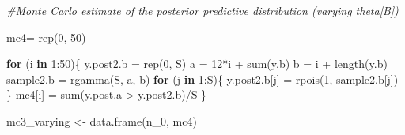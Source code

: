\documentclass[
  11pt,
]{article}
\newenvironment{Shaded}{\begin{snugshade}}{\end{snugshade}}
\newcommand{\CommentTok}[1]{\textcolor[rgb]{0.56,0.35,0.01}{\textit{#1}}}
\newcommand{\ControlFlowTok}[1]{\textcolor[rgb]{0.13,0.29,0.53}{\textbf{#1}}}
\newcommand{\DecValTok}[1]{\textcolor[rgb]{0.00,0.00,0.81}{#1}}
\newcommand{\FunctionTok}[1]{\textcolor[rgb]{0.00,0.00,0.00}{#1}}
\newcommand{\NormalTok}[1]{#1}
\newcommand{\OtherTok}[1]{\textcolor[rgb]{0.56,0.35,0.01}{#1}}
\newcommand{\SpecialCharTok}[1]{\textcolor[rgb]{0.00,0.00,0.00}{#1}}
\begin{document}
\begin{Shaded}
\begin{Highlighting}[]
\CommentTok{\#Monte Carlo estimate of the posterior predictive distribution (varying theta[B])}

\NormalTok{mc4}\OtherTok{=} \FunctionTok{rep}\NormalTok{(}\DecValTok{0}\NormalTok{, }\DecValTok{50}\NormalTok{)}

\ControlFlowTok{for}\NormalTok{ (i }\ControlFlowTok{in} \DecValTok{1}\SpecialCharTok{:}\DecValTok{50}\NormalTok{)\{}
\NormalTok{  y.post2.b }\OtherTok{=} \FunctionTok{rep}\NormalTok{(}\DecValTok{0}\NormalTok{, S)}
\NormalTok{  a }\OtherTok{=} \DecValTok{12}\SpecialCharTok{*}\NormalTok{i }\SpecialCharTok{+} \FunctionTok{sum}\NormalTok{(y.b)}
\NormalTok{  b }\OtherTok{=}\NormalTok{ i }\SpecialCharTok{+} \FunctionTok{length}\NormalTok{(y.b)}
\NormalTok{  sample2.b }\OtherTok{=} \FunctionTok{rgamma}\NormalTok{(S, a, b)}
  \ControlFlowTok{for}\NormalTok{ (j }\ControlFlowTok{in} \DecValTok{1}\SpecialCharTok{:}\NormalTok{S)\{}
\NormalTok{  y.post2.b[j] }\OtherTok{=} \FunctionTok{rpois}\NormalTok{(}\DecValTok{1}\NormalTok{, sample2.b[j])}
\NormalTok{  \}}
\NormalTok{  mc4[i] }\OtherTok{=} \FunctionTok{sum}\NormalTok{(y.post.a }\SpecialCharTok{\textgreater{}}\NormalTok{ y.post2.b)}\SpecialCharTok{/}\NormalTok{S}
\NormalTok{\}}

\NormalTok{mc3\_varying }\OtherTok{\textless{}{-}} \FunctionTok{data.frame}\NormalTok{(n\_0, mc4)}
\end{Highlighting}
\end{Shaded}
\end{document}
